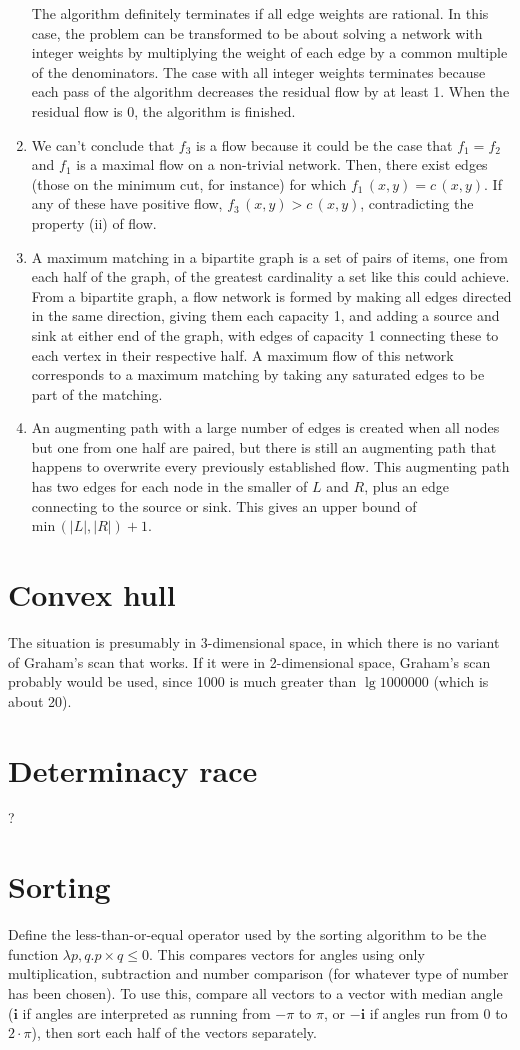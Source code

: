 \documentclass[11pt]{article}
\begin{document}
\begin{enumerate}
  The algorithm definitely terminates if all edge weights are rational. In this case, the problem can be transformed to be about solving a network with integer weights by multiplying the weight of each edge by a common multiple of the denominators. The case with all integer weights terminates because each pass of the algorithm decreases the residual flow by at least 1. When the residual flow is 0, the algorithm is finished.
\item We can't conclude that \(f_3\) is a flow because it could be the case that \(f_1=f_2\) and \(f_1\) is a maximal flow on a non-trivial network. Then, there exist edges (those on the minimum cut, for instance) for which \(f_1\,(x,y)=c\,(x,y)\). If any of these have positive flow, \(f_3\,(x,y)>c\,(x,y)\), contradicting the property (ii) of flow.
\item A maximum matching in a bipartite graph is a set of pairs of items, one from each half of the graph, of the greatest cardinality a set like this could achieve. From a bipartite graph, a flow network is formed by making all edges directed in the same direction, giving them each capacity 1, and adding a source and sink at either end of the graph, with edges of capacity 1 connecting these to each vertex in their respective half. A maximum flow of this network corresponds to a maximum matching by taking any saturated edges to be part of the matching.
\item An augmenting path with a large number of edges is created when all nodes but one from one half are paired, but there is still an augmenting path that happens to overwrite every previously established flow. This augmenting path has two edges for each node in the smaller of \(L\) and \(R\), plus an edge connecting to the source or sink. This gives an upper bound of \(\mathrm{min}\,(|L|,|R|)+1\).
\end{enumerate}

\section{Convex hull}
The situation is presumably in 3-dimensional space, in which there is no variant of Graham's scan that works. If it were in 2-dimensional space, Graham's scan probably would be used, since 1000 is much greater than \(\lg 1000000\) (which is about 20).

\section{Determinacy race}
?

\section{Sorting}
Define the less-than-or-equal operator used by the sorting algorithm to be the function \(\lambda p,q.p\times q\leq 0\). This compares vectors for angles using only multiplication, subtraction and number comparison (for whatever type of number has been chosen). To use this, compare all vectors to a vector with median angle (\(\mathbf i\) if angles are interpreted as running from \(-\pi\) to \(\pi\), or \(-\mathbf i\) if angles run from \(0\) to \(2\cdot\pi\)), then sort each half of the vectors separately.
\end{document}
